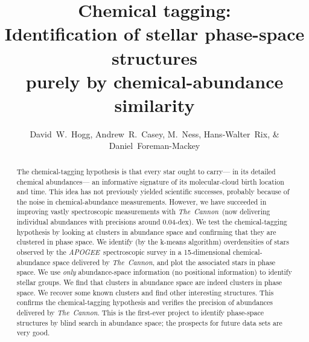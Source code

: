 \documentclass[12pt, letterpaper, preprint]{aastex}
\newcommand{\acronym}[1]{{\small{#1}}}
\newcommand{\project}[1]{\textsl{#1}}
\newcommand{\apogee}{\project{\acronym{APOGEE}}}
\newcommand{\thecannon}{\project{The~Cannon}}
\begin{document}
\title{Chemical tagging: \\
       Identification of stellar phase-space structures \\
       purely by chemical-abundance similarity}
\author{David~W.~Hogg,
        Andrew~R.~Casey,
        M.~Ness,
        Hans-Walter~Rix, \&
        Daniel~Foreman-Mackey}

\begin{abstract}
The chemical-tagging hypothesis is that every star ought to carry---%
in its detailed chemical abundances---%
an informative signature of its molecular-cloud birth location and time.
This idea has not previously yielded scientific successes, probably because of the
noise in chemical-abundance measurements.
However, we have succeeded in improving vastly spectroscopic measurements with \thecannon\ 
(now delivering individual abundances with precisions around 0.04-dex).
We test the chemical-tagging hypothesis by looking at clusters in abundance space
and confirming that they are clustered in phase space.
We identify (by the k-means algorithm) overdensities of stars observed by the \apogee\ spectroscopic survey
in a 15-dimensional chemical-abundance space delivered by \thecannon,
and plot the associated stars in phase space.
We use \emph{only} abundance-space information (no positional information) to identify stellar groups.
We find that clusters in abundance space are indeed clusters in phase space.
We recover some known clusters and find other interesting structures.
This confirms the chemical-tagging hypothesis and verifies the precision of abundances delivered by \thecannon.
This is the first-ever project to identify phase-space structures by blind search in abundance space;
the prospects for future data sets are very good.
\end{abstract}

\end{document}
